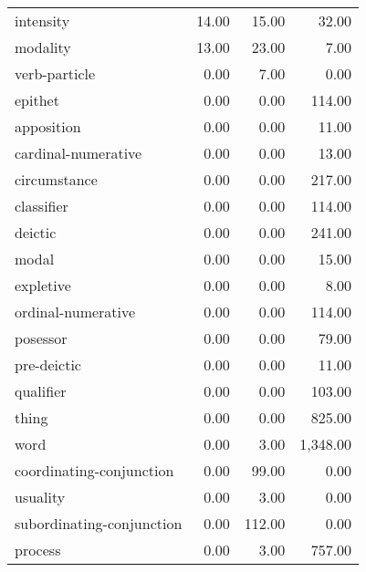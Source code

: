 \begin{table}[!ht]
\begin{tabular}{lrrr}
intensity                 &    14.00 &               15.00 &               32.00 \\
modality                  &    13.00 &               23.00 &                7.00 \\
verb-particle             &     0.00 &                7.00 &                0.00 \\
epithet                   &     0.00 &                0.00 &              114.00 \\
apposition                &     0.00 &                0.00 &               11.00 \\
cardinal-numerative       &     0.00 &                0.00 &               13.00 \\
circumstance              &     0.00 &                0.00 &              217.00 \\
classifier                &     0.00 &                0.00 &              114.00 \\
deictic                   &     0.00 &                0.00 &              241.00 \\
modal                     &     0.00 &                0.00 &               15.00 \\
expletive                 &     0.00 &                0.00 &                8.00 \\
ordinal-numerative        &     0.00 &                0.00 &              114.00 \\
posessor                  &     0.00 &                0.00 &               79.00 \\
pre-deictic               &     0.00 &                0.00 &               11.00 \\
qualifier                 &     0.00 &                0.00 &              103.00 \\
thing                     &     0.00 &                0.00 &              825.00 \\
word                      &     0.00 &                3.00 &            1,348.00 \\
coordinating-conjunction  &     0.00 &               99.00 &                0.00 \\
usuality                  &     0.00 &                3.00 &                0.00 \\
subordinating-conjunction &     0.00 &              112.00 &                0.00 \\
process                   &     0.00 &                3.00 &              757.00 \\

\end{tabular}
\end{table}
